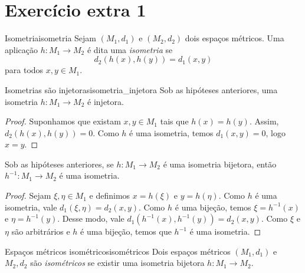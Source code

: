 \section*{Exercício extra 1}
\begin{definition}{Isometria}{isometria}
    Sejam \((M_1, d_1)\) e \((M_2, d_2)\) dois espaços métricos. Uma aplicação \(h : M_1 \to M_2\) é dita uma \emph{isometria} se
    \begin{equation*}
        d_2(h(x), h(y)) = d_1(x,y)
    \end{equation*}
    para todos \(x,y \in M_1\).
\end{definition}

\begin{proposition}{Isometrias são injetoras}{isometria_injetora}
    Sob as hipóteses anteriores, uma isometria \(h : M_1 \to M_2\) é injetora.
\end{proposition}
\begin{proof}
    Suponhamos que existam \(x, y \in M_1\) tais que \(h(x) = h(y)\). Assim, \(d_2(h(x), h(y)) = 0\). Como \(h\) é uma isometria, temos \(d_1(x,y) = 0\), logo \(x = y\).
\end{proof}

\begin{proposition}{}{}
    Sob as hipóteses anteriores, se \(h : M_1 \to M_2\) é uma isometria bijetora, então \(h^{-1} : M_1 \to M_2\) é uma isometria.
\end{proposition}
\begin{proof}
    Sejam \(\xi, \eta \in M_1\) e definimos \(x = h(\xi)\) e \(y = h(\eta)\). Como \(h\) é uma isometria, vale \(d_1(\xi, \eta) = d_2(x,y)\). Como \(h\) é uma bijeção, temos \(\xi = h^{-1}(x)\) e \(\eta = h^{-1}(y)\). Desse modo, vale \(d_1(h^{-1}(x), h^{-1}(y)) = d_2(x,y)\). Como \(\xi\) e \(\eta\) são arbitrários e \(h\) é uma bijeção, temos que \(h^{-1}\) é uma isometria.
\end{proof}

\begin{definition}{Espaços métricos isométricos}{isométricos}
    Dois espaços métricos \((M_1, d_1)\) e \(M_2, d_2\) são \emph{isométricos} se existir uma isometria bijetora \(h : M_1 \to M_2\).
\end{definition}

